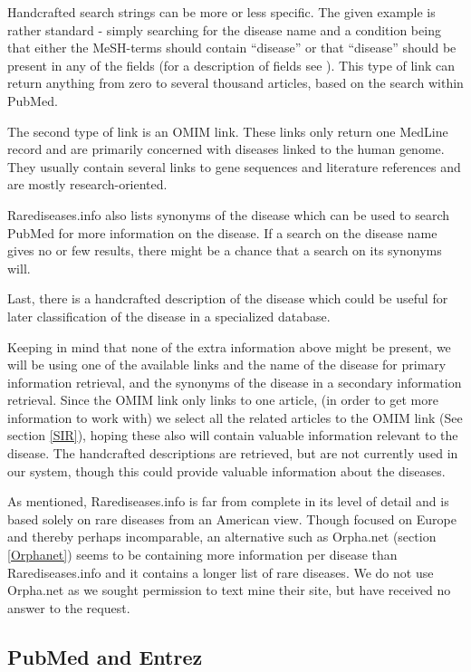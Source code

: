 Handcrafted search strings can be more or less specific. The given
example is rather standard - simply searching for the disease name and
a condition being that either the MeSH-terms should contain ``disease''
or that ``disease'' should be present in any of the fields (for a
description of fields see
\cite{PubMedHelpSearchFieldDescriptionsTags}). This type of link can
return anything from zero to several thousand articles, based on the
search within PubMed.

The second type of link is an OMIM link. These links only return one
MedLine record and are primarily concerned with diseases linked to the
human genome. They usually contain several links to gene sequences and
literature references and are mostly research-oriented.

Rarediseases.info also lists synonyms of the disease which can be used
to search PubMed for more information on the disease. If a search on
the disease name gives no or few results, there might be a chance
that a search on its synonyms will.

Last, there is a handcrafted description of the disease which could be
useful for later classification of the disease in a specialized
database.

Keeping in mind that none of the extra information above might be
present, we will be using one of the available links and the name of
the disease for primary information retrieval, and the synonyms of the
disease in a secondary information retrieval. Since the OMIM link only
links to one article, (in order to get more
information to work with) we select all the related articles to the
OMIM link (See section \ref{SIR}), hoping these also will contain valuable information
relevant to the disease. The handcrafted descriptions are retrieved,
but are not currently used in our system, though this could provide
valuable information about the diseases.

As mentioned, Rarediseases.info is far from complete in its level of
detail and is based solely on rare diseases from an American
view. Though focused on Europe and thereby perhaps incomparable, an
alternative such as Orpha.net (section \ref{Orphanet}) seems to be
containing more information per disease than Rarediseases.info and it
contains a longer list of rare diseases. We do not use Orpha.net
as we sought permission to text mine their site, but have
received no answer to the request.

\subsection{PubMed and Entrez\label{PubmedEntrez}}

